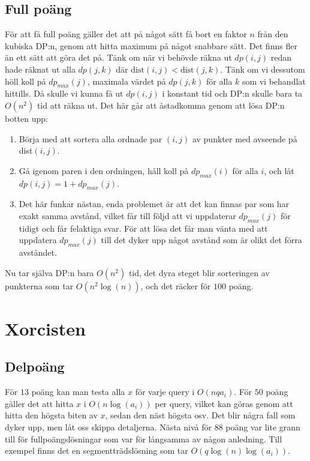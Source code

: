 \documentclass{article}
\begin{document}
\subsection*{Full poäng}
För att få full poäng gäller det att på något sätt få bort en faktor $n$ från den kubiska DP:n, genom att hitta maximum på något snabbare sätt. Det finns fler än ett sätt att göra det på. Tänk om när vi behövde räkna ut $dp(i,j)$ redan hade räknat ut alla $dp(j,k)$ där $\text{dist}(i,j) < \text{dist}(j,k)$. Tänk om vi dessutom höll koll på $dp_{max}(j)$, maximala värdet på $dp(j,k)$ för alla $k$ som vi behandlat hittills. Då skulle vi kunna få ut $dp(i,j)$ i konstant tid och DP:n skulle bara ta $O(n^2)$ tid att räkna ut. Det här går att åstadkomma genom att lösa DP:n botten upp: 
\begin{enumerate}
    \item Börja med att sortera alla ordnade par $(i,j)$ av punkter med avseende på dist$(i,j)$.
    
    \item Gå igenom paren i den ordningen, håll koll på $dp_{max}(i)$ för alla $i$, och låt $dp(i,j) = 1 + dp_{max}(j)$.
    
    \item Det här funkar nästan, enda problemet är att det kan finnas par som har exakt samma avstånd, vilket får till följd att vi uppdaterar $dp_{max}(j)$ för tidigt och får felaktiga svar. För att lösa det får man vänta med att uppdatera $dp_{max}(j)$ till det dyker upp något avstånd som är olikt det förra avståndet.
    
\end{enumerate}

Nu tar själva DP:n bara $O(n^2)$ tid, det dyra steget blir sorteringen av punkterna som tar $O(n^2\log(n))$, och det räcker för $100$ poäng.


\section*{Xorcisten}

\subsection*{Delpoäng}
För $13$ poäng kan man testa alla $x$ för varje query i $O(nqa_i)$. För $50$ poäng gäller det att hitta $x$ i $O(n\log(a_i))$ per query, vilket kan göras genom att hitta den högsta biten av $x$, sedan den näst högsta osv. Det blir några fall som dyker upp, men låt oss skippa detaljerna. Nästa nivå för $88$ poäng var lite grann till för fullpoängslösningar som var för långsamma av någon anledning. Till exempel finns det en segmentträdslösning som tar $O(q\log(n)\log(a_i))$.
\end{document}
